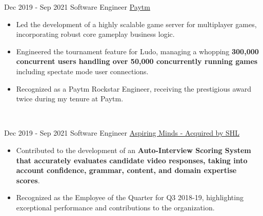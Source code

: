 \documentclass[letterpaper]{twentysecondcv} %
\begin{document}
\begin{fullwidth}
\begin{twenty}
     \twentyitem
   		{Dec 2019 -}
		{Sep 2021}
        {Software Engineer}
        {\href{https://paytm.com/}{Paytm}}
        {}
        {\begin{itemize}
        \item Led the development of a highly scalable game server for multiplayer games, incorporating robust core gameplay business logic.
        \item Engineered the tournament feature for Ludo, managing a whopping \textbf{300,000 concurrent users handling over 50,000 concurrently running games} including spectate mode user connections.
        \item Recognized as a Paytm Rockstar Engineer, receiving the prestigious award twice during my tenure at Paytm.
        \end{itemize}}
    \\
\end{twenty}
\begin{twenty}
     \twentyitem
   		{Dec 2019 -}
		{Sep 2021}
        {Software Engineer}
        {\href{https://www.shl.com/en-in/}{Aspiring Minds - Acquired by SHL}}
        {}
        {\begin{itemize}
        \item Contributed to the development of an \textbf{Auto-Interview Scoring System that accurately evaluates candidate video responses, taking into account confidence, grammar, content, and domain expertise scores}.
        \item Recognized as the Employee of the Quarter for Q3 2018-19, highlighting exceptional performance and contributions to the organization.
        \end{itemize}}
    \\
\end{twenty}


\end{fullwidth}
\end{document}
